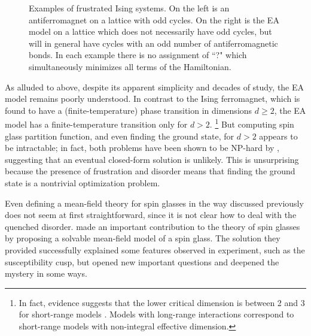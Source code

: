\begin{figure}
  \centering
  \begin{subfigure}{0.49\textwidth}
    \centering
    
    \label{fig:frust-afm}
  \end{subfigure}
  \begin{subfigure}{0.49\textwidth}
    \centering
    
    \label{fig:frust-disorder}
  \end{subfigure}
  \caption[Examples of frustrated Ising systems.]
  {
    Examples of frustrated Ising systems. On the left  is
    an antiferromagnet on a lattice with odd cycles. On the right
     is the EA model on a lattice which does not
    necessarily have odd cycles, but will in general have cycles with an odd
    number of antiferromagnetic bonds. In each example there is no assignment
    of ``?" which simultaneously minimizes all terms of the Hamiltonian.
  }
\end{figure}

As alluded to above, despite its apparent simplicity and decades of study, the
EA model remains poorly understood. In contrast to the Ising ferromagnet, which
is found to have a (finite-temperature) phase transition in dimensions $d \geq
2$, the EA model has a finite-temperature transition only for $d>2$.%
\footnote{%
  In fact, evidence suggests that the lower critical dimension is between 2 and
  3 for short-range models \autocite{hartmann2001lower}. Models with long-range
  interactions correspond to short-range models with non-integral effective
  dimension.
}
But computing spin glass partition function, and even finding the ground state,
for $d>2$ appears to be intractable; in fact, both problems have been shown to
be NP-hard by \textcite{barahona1982computational}, suggesting that an eventual
closed-form solution is unlikely. This is unsurprising because the presence of
frustration and disorder means that finding the ground state is a nontrivial
optimization problem.

Even defining a mean-field theory for spin glasses in the
way discussed previously does not seem at first straightforward, since it is
not clear how to deal with the quenched disorder.
\textcite{sherrington1975solvable} made an important contribution to the theory
of spin glasses by proposing a solvable mean-field model of a spin glass. The
solution they provided successfully explained some features observed in
experiment, such as the susceptibility cusp, but opened new important questions
and deepened the mystery in some ways.


